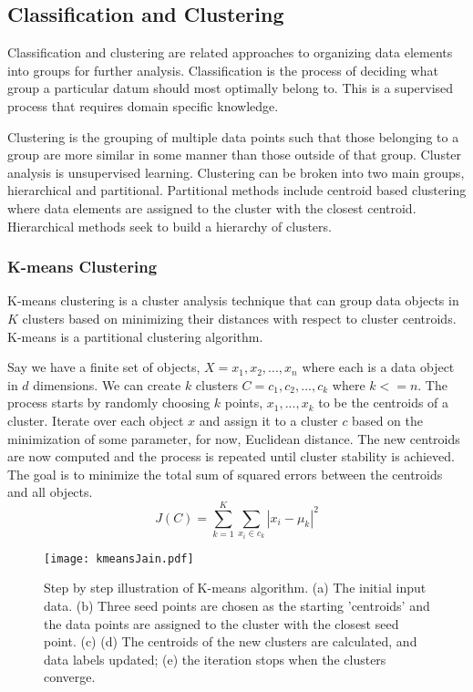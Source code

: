 \documentclass[12pt]{article}
\begin{document}
\begin{doublespacing}
\subsection{Classification and Clustering}
Classification and clustering are related approaches to organizing data elements into groups for further analysis.
Classification is the process of deciding what group a particular datum should most optimally belong to.
This is a supervised process that requires domain specific knowledge.

Clustering is the grouping of multiple data points such that those belonging to a group are more similar in some manner than those outside of that group.
Cluster analysis is unsupervised learning.
Clustering can be broken into two main groups, hierarchical and partitional. \citep{Jain2010651}
Partitional methods include centroid based clustering where data elements are assigned to the cluster with the closest centroid.
Hierarchical methods seek to build a hierarchy of clusters.

\subsubsection{K-means Clustering}
K-means clustering is a cluster analysis technique that can group data objects in $K$ clusters based on minimizing their distances with respect to cluster centroids.
K-means is a partitional clustering algorithm.

Say we have a finite set of objects,  $X = {x_1, x_2, ..., x_n}$ where each is a data object in $d$ dimensions.
We can create $k$ clusters $C = {c_1, c_2, ..., c_k}$ where $k <= n$.
The process starts by randomly choosing $k$ points, ${x_1, ..., x_k}$ to be the centroids of a cluster.
Iterate over each object $x$ and assign it to a cluster $c$ based on the minimization of some parameter, for now, Euclidean distance.
The new centroids are now computed and the process is repeated until cluster stability is achieved.
The goal is to minimize the total sum of squared errors between the centroids and all objects. 
\begin{equation} \label{kmeans}
J(C) = \sum^K_{k=1} \sum_{x_i \in c_k} \left| x_i - \mu_k \right| ^2
\end{equation}

\begin{figure}[!hb]
    \centering
    \texttt{[image: kmeansJain.pdf]}
    \caption{Step by step illustration of K-means algorithm. (a) The initial input data. (b) Three seed points are chosen as the starting 'centroids' and the data points are assigned to the cluster with the closest seed point. (c) (d) The centroids of the new clusters are calculated, and data labels updated; (e) the iteration stops when the clusters converge.}
    \label{fig:K-Means-Jain}
\end{figure}


\end{doublespacing}
\end{document}

